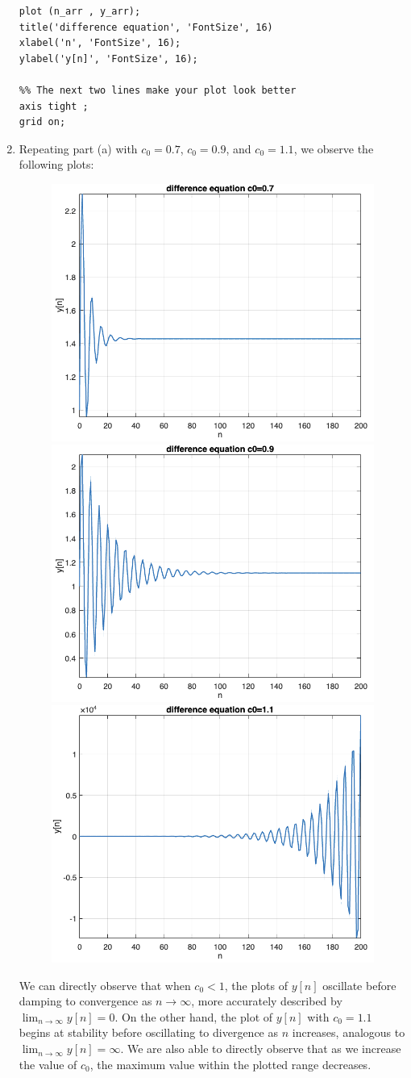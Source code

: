 \documentclass[12pt]{article}
\begin{document}
\begin{enumerate}[label=\textbf{\alph*)}, leftmargin=2.6em]
\begin{verbatim}
plot (n_arr , y_arr);
title('difference equation', 'FontSize', 16)
xlabel('n', 'FontSize', 16);
ylabel('y[n]', 'FontSize', 16);

%% The next two lines make your plot look better
axis tight ;
grid on;
\end{verbatim}

\item Repeating part (a) with $c_0=0.7$, $c_0=0.9$, and $c_0=1.1$, we observe the following plots:
\begin{figure}[H]
    \centering
    \includegraphics[width=0.32\linewidth]{plot2.png}
    \includegraphics[width=0.32\linewidth]{plot3.png}
    \includegraphics[width=0.32\linewidth]{plot4.png}
\end{figure}
We can directly observe that when $c_0<1$, the plots of $y[n]$ oscillate before damping to convergence as $n \to \infty$, more accurately described by $\lim_{n \to \infty}y[n]=0$. On the other hand, the plot of $y[n]$ with $c_0=1.1$ begins at stability before oscillating to divergence as $n$ increases, analogous to $\lim_{n \to \infty}y[n]=\infty$. We are also able to directly observe that as we increase the value of $c_0$, the maximum value within the plotted range decreases.


\end{enumerate}
\end{document}
